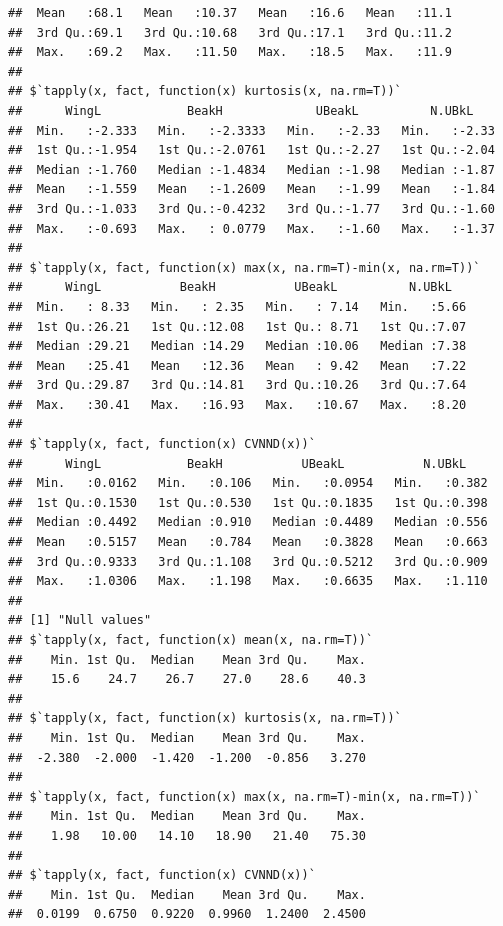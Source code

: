 \documentclass[12pt]{article}\usepackage[]{graphicx}\usepackage[]{color}
\makeatletter
\newenvironment{kframe}{%
 \def\at@end@of@kframe{}%
 \ifinner\ifhmode%
  \def\at@end@of@kframe{\end{minipage}}%
  \begin{minipage}{\columnwidth}%
 \fi\fi%
 \def\FrameCommand##1{\hskip\@totalleftmargin \hskip-\fboxsep
 \colorbox{shadecolor}{##1}\hskip-\fboxsep
     \hskip-\linewidth \hskip-\@totalleftmargin \hskip\columnwidth}%
 \MakeFramed {\advance\hsize-\width
   \@totalleftmargin\z@ \linewidth\hsize
   \@setminipage}}%
 {\par\unskip\endMakeFramed%
 \at@end@of@kframe}
\newenvironment{knitrout}{}{} %
\makeatother
\begin{document}
\begin{knitrout}
\begin{kframe}
\begin{verbatim}
##  Mean   :68.1   Mean   :10.37   Mean   :16.6   Mean   :11.1  
##  3rd Qu.:69.1   3rd Qu.:10.68   3rd Qu.:17.1   3rd Qu.:11.2  
##  Max.   :69.2   Max.   :11.50   Max.   :18.5   Max.   :11.9  
## 
## $`tapply(x, fact, function(x) kurtosis(x, na.rm=T))`
##      WingL            BeakH             UBeakL          N.UBkL     
##  Min.   :-2.333   Min.   :-2.3333   Min.   :-2.33   Min.   :-2.33  
##  1st Qu.:-1.954   1st Qu.:-2.0761   1st Qu.:-2.27   1st Qu.:-2.04  
##  Median :-1.760   Median :-1.4834   Median :-1.98   Median :-1.87  
##  Mean   :-1.559   Mean   :-1.2609   Mean   :-1.99   Mean   :-1.84  
##  3rd Qu.:-1.033   3rd Qu.:-0.4232   3rd Qu.:-1.77   3rd Qu.:-1.60  
##  Max.   :-0.693   Max.   : 0.0779   Max.   :-1.60   Max.   :-1.37  
## 
## $`tapply(x, fact, function(x) max(x, na.rm=T)-min(x, na.rm=T))`
##      WingL           BeakH           UBeakL          N.UBkL    
##  Min.   : 8.33   Min.   : 2.35   Min.   : 7.14   Min.   :5.66  
##  1st Qu.:26.21   1st Qu.:12.08   1st Qu.: 8.71   1st Qu.:7.07  
##  Median :29.21   Median :14.29   Median :10.06   Median :7.38  
##  Mean   :25.41   Mean   :12.36   Mean   : 9.42   Mean   :7.22  
##  3rd Qu.:29.87   3rd Qu.:14.81   3rd Qu.:10.26   3rd Qu.:7.64  
##  Max.   :30.41   Max.   :16.93   Max.   :10.67   Max.   :8.20  
## 
## $`tapply(x, fact, function(x) CVNND(x))`
##      WingL            BeakH           UBeakL           N.UBkL     
##  Min.   :0.0162   Min.   :0.106   Min.   :0.0954   Min.   :0.382  
##  1st Qu.:0.1530   1st Qu.:0.530   1st Qu.:0.1835   1st Qu.:0.398  
##  Median :0.4492   Median :0.910   Median :0.4489   Median :0.556  
##  Mean   :0.5157   Mean   :0.784   Mean   :0.3828   Mean   :0.663  
##  3rd Qu.:0.9333   3rd Qu.:1.108   3rd Qu.:0.5212   3rd Qu.:0.909  
##  Max.   :1.0306   Max.   :1.198   Max.   :0.6635   Max.   :1.110  
## 
## [1] "Null values"
## $`tapply(x, fact, function(x) mean(x, na.rm=T))`
##    Min. 1st Qu.  Median    Mean 3rd Qu.    Max. 
##    15.6    24.7    26.7    27.0    28.6    40.3 
## 
## $`tapply(x, fact, function(x) kurtosis(x, na.rm=T))`
##    Min. 1st Qu.  Median    Mean 3rd Qu.    Max. 
##  -2.380  -2.000  -1.420  -1.200  -0.856   3.270 
## 
## $`tapply(x, fact, function(x) max(x, na.rm=T)-min(x, na.rm=T))`
##    Min. 1st Qu.  Median    Mean 3rd Qu.    Max. 
##    1.98   10.00   14.10   18.90   21.40   75.30 
## 
## $`tapply(x, fact, function(x) CVNND(x))`
##    Min. 1st Qu.  Median    Mean 3rd Qu.    Max. 
##  0.0199  0.6750  0.9220  0.9960  1.2400  2.4500
\end{verbatim}
\begin{alltt}

\end{alltt}
\end{kframe}
\end{knitrout}
\end{document}
